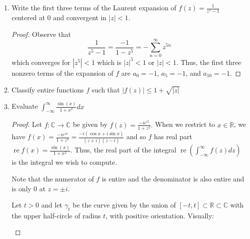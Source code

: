 \documentclass{article}
\DeclareMathOperator{\re}{re}
\begin{document}
\begin{enumerate}
\begin{proof}
	\end{proof}
	
	\newpage
	
	\item Write the first three terms of the Laurent expansion of $\displaystyle f(z) = \frac{1}{z^5-1}$ centered at $0$ and convergent in $|z|<1$.
	
	\begin{proof}
		Observe that \[\frac{1}{z^5-1} = \frac{-1}{1-z^5} = -\sum_{n=0}^\infty z^{5n}\]
		which converges for $|z^5|<1$ which is $|z|^5<1$ or $|z|<1$. 
		Thus, the first three nonzero terms of the expansion of $f$ are 
		$a_0 = -1$, $a_5=-1$, and $a_{10} = -1$.
	\end{proof}
	
	\item Classify entire functions $f$ such that $|f(z)| \leq 1 + \sqrt{|z|}$
	
	\item Evaluate $\displaystyle \int_{-\infty}^\infty \frac{\sin(x)}{1+x^2} dx$
	
	\begin{proof}
		Let $f: \mathbb{C} \rightarrow \mathbb{C}$ be given by $f(z) = \frac{-i e^{iz}}{1+z^2}.$ 
		When we restrict to $x \in \mathbb{R}$, we have 
		$f(x) = \frac{-ie^{ix}}{1+z^2} = \frac{-i(\cos x + i \sin x)}{(z+i)(z-i)}$ and so $f$ has real part $\re f(x) = \frac{\sin(x)}{1+x^2}$.
		Thus, the real part of the integral $\re \left (\int_{-\infty}^{\infty} f(z) dz \right)$ is the integral we wish to compute.
		
		Note that the numerator of $f$ is entire and the denominator is also entire and is only $0$ at $z = \pm i$.
		
		Let $t>0$ and let $\gamma_t$ be the curve given by the union of $[-t,t] \subset \mathbb{R}\subset \mathbb{C}$ with the upper half-circle of radius $t$, with positive orientation. 
		Visually:
		\begin{center}
\end{center}
\end{proof}
\end{enumerate}
\end{document}
